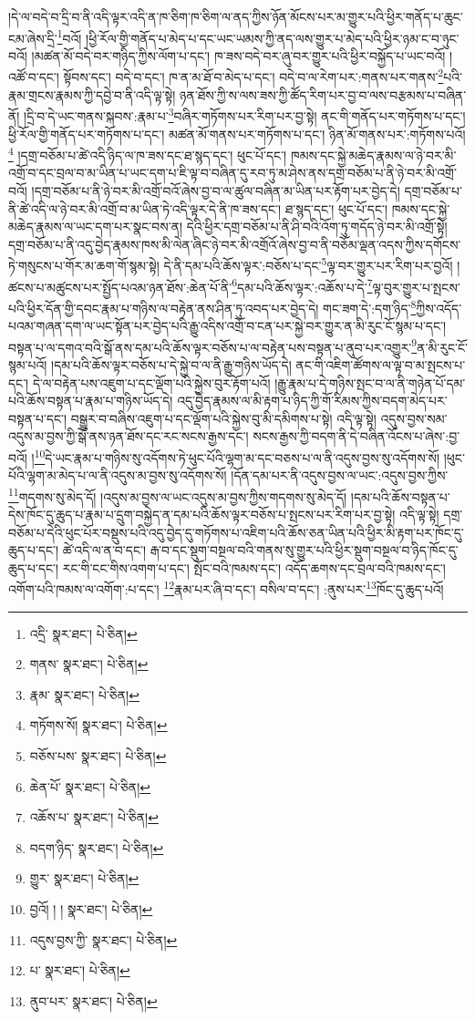 །དེ་ལ་བདེ་བ་དྲི་བ་ནི་འདི་ལྟར་འདི་ན་ཁ་ཅིག་ཁ་ཅིག་ལ་ནད་ཀྱིས་ཉོན་མོངས་པར་མ་གྱུར་པའི་ཕྱིར་གནོད་པ་ཆུང་ངམ་ཞེས་དྲི་\footnote{འདྲི་  སྣར་ཐང་།  པེ་ཅིན། }བའོ། །ཕྱི་རོལ་གྱི་གནོད་པ་མེད་པ་དང་ཡང་ཡམས་ཀྱི་ནད་ལས་གྱུར་པ་མེད་པའི་ཕྱིར་ཉམ་ང་བ་ཉུང་བའོ། །མཚན་མོ་བདེ་བར་གཉིད་ཀྱིས་ལོག་པ་དང་། ཁ་ཟས་བདེ་བར་ཞུ་བར་གྱུར་པའི་ཕྱིར་བསྐྱོད་པ་ཡང་བའོ། །འཚོ་བ་དང་། སྟོབས་དང་། བདེ་བ་དང་། ཁ་ན་མ་ཐོ་བ་མེད་པ་དང་། བདེ་བ་ལ་རེག་པར་:གནས་པར་གནས་\footnote{གནས་  སྣར་ཐང་།  པེ་ཅིན། }པའི་རྣམ་གྲངས་རྣམས་ཀྱི་དབྱེ་བ་ནི་འདི་ལྟ་སྟེ། ཉན་ཐོས་ཀྱི་ས་ལས་ཟས་ཀྱི་ཚོད་རིག་པར་བྱ་བ་ལས་བརྩམས་པ་བཞིན་ནོ། །དྲི་བ་དེ་ཡང་གནས་སྐབས་:རྣམ་པ་\footnote{རྣམ་  སྣར་ཐང་།  པེ་ཅིན། }བཞིར་གཏོགས་པར་རིག་པར་བྱ་སྟེ། ནང་གི་གནོད་པར་གཏོགས་པ་དང་། ཕྱི་རོལ་གྱི་གནོད་པར་གཏོགས་པ་དང་། མཚན་མོ་གནས་པར་གཏོགས་པ་དང་། ཉིན་མོ་གནས་པར་:གཏོགས་པའོ།\footnote{གཏོགས་སོ།  སྣར་ཐང་།  པེ་ཅིན། } །དགྲ་བཅོམ་པ་ཚེ་འདི་ཉིད་ལ་ཁ་ཟས་དང་ཐ་སྙད་དང་། ཕུང་པོ་དང་། ཁམས་དང་སྐྱེ་མཆེད་རྣམས་ལ་ཉེ་བར་མི་འགྲོ་བ་དང་བྲལ་བ་མ་ཡིན་པ་ཡང་དག་པ་ཇི་ལྟ་བ་བཞིན་དུ་རབ་ཏུ་མ་ཤེས་ནས་དགྲ་བཅོམ་པ་ནི་ཉེ་བར་མི་འགྲོ་བའོ། །དགྲ་བཅོམ་པ་ནི་ཉེ་བར་མི་འགྲོ་བའོ་ཞེས་བྱ་བ་ལ་ཚུལ་བཞིན་མ་ཡིན་པར་རྟོག་པར་བྱེད་དེ། དགྲ་བཅོམ་པ་ནི་ཚེ་འདི་ལ་ཉེ་བར་མི་འགྲོ་བ་མ་ཡིན་ཏེ་འདི་ལྟར་དེ་ནི་ཁ་ཟས་དང་། ཐ་སྙད་དང་། ཕུང་པོ་དང་། ཁམས་དང་སྐྱེ་མཆེད་རྣམས་ལ་ཡང་དག་པར་སྣང་བས་ན། དེའི་ཕྱིར་དགྲ་བཅོམ་པ་ནི་ཤི་བའི་འོག་ཏུ་གདོད་ཉེ་བར་མི་འགྲོ་སྟེ། དགྲ་བཅོམ་པ་ནི་འདུ་བྱེད་རྣམས་ཁས་མི་ལེན་ཞིང་ཉེ་བར་མི་འགྲོའོ་ཞེས་བྱ་བ་ནི་བཅོམ་ལྡན་འདས་ཀྱིས་དགོངས་ཏེ་གསུངས་པ་གོར་མ་ཆག་གོ་སྙམ་སྟེ། དེ་ནི་དམ་པའི་ཆོས་ལྟར་:བཅོས་པ་དང་\footnote{བཅོས་པས་  སྣར་ཐང་།  པེ་ཅིན། }ལྟ་བར་གྱུར་པར་རིག་པར་བྱའོ། །ཚངས་པ་མཚུངས་པར་སྤྱོད་པའམ་ཉན་ཐོས་:ཆེན་པོ་ནི་\footnote{ཆེན་པོ་  སྣར་ཐང་།  པེ་ཅིན། }དམ་པའི་ཆོས་ལྟར་:འཆོས་པ་དེ་\footnote{འཆོས་པ་  སྣར་ཐང་།  པེ་ཅིན། }ལྟ་བུར་གྱུར་པ་སྤངས་པའི་ཕྱིར་དོན་གྱི་དབང་རྣམ་པ་གཉིས་ལ་བརྟེན་ནས་ཤིན་ཏུ་འབད་པར་བྱེད་དེ། གང་ཟག་དེ་:དག་ཉིད་\footnote{བདག་ཉིད་  སྣར་ཐང་།  པེ་ཅིན། }ཀྱིས་འདོད་པའམ་གཞན་དག་ལ་ཡང་སྟོན་པར་བྱེད་པའི་རྒྱུ་འདིས་འགྲོ་བ་ངན་པར་སྐྱེ་བར་གྱུར་ན་མི་རུང་ངོ་སྙམ་པ་དང་། བསྟན་པ་ལ་དགའ་བའི་སྒོ་ནས་དམ་པའི་ཆོས་ལྟར་བཅོས་པ་ལ་བརྟེན་པས་བསྟན་པ་ནུབ་པར་འགྱུར་\footnote{གྱུར་  སྣར་ཐང་།  པེ་ཅིན། }ན་མི་རུང་ངོ་སྙམ་པའོ། །དམ་པའི་ཆོས་ལྟར་བཅོས་པ་དེ་སྐྱེ་བ་ལ་ནི་རྒྱུ་གཉིས་ཡོད་དེ། ནང་གི་འཇིག་ཚོགས་ལ་ལྟ་བ་མ་སྤངས་པ་དང་། དེ་ལ་བརྟེན་པས་འཇུག་པ་དང་ལྡོག་པའི་སྐྱེས་བུར་རྟོག་པའོ། །རྒྱུ་རྣམ་པ་དེ་གཉིས་སྤང་བ་ལ་ནི་གཉེན་པོ་དམ་པའི་ཆོས་བསྟན་པ་རྣམ་པ་གཉིས་ཡོད་དེ། འདུ་བྱེད་རྣམས་ལ་མི་རྟག་པ་ཉིད་ཀྱི་གོ་རིམས་ཀྱིས་བདག་མེད་པར་བསྟན་པ་དང་། བསྒྱུར་བ་བཞིས་འཇུག་པ་དང་ལྡོག་པའི་སྐྱེས་བུ་མི་དམིགས་པ་སྟེ། འདི་ལྟ་སྟེ། འདུས་བྱས་སམ་འདུས་མ་བྱས་ཀྱི་སྒོ་ནས་ཉན་ཐོས་དང་རང་སངས་རྒྱས་དང་། སངས་རྒྱས་ཀྱི་བདག་ནི་དེ་བཞིན་འོངས་པ་ཞེས་:བྱ་བའོ། །\footnote{བྱའོ། ། །  སྣར་ཐང་།  པེ་ཅིན། }དེ་ཡང་རྣམ་པ་གཉིས་སུ་འདོགས་ཏེ་ཕུང་པོའི་ལྷག་མ་དང་བཅས་པ་ལ་ནི་འདུས་བྱས་སུ་འདོགས་སོ། །ཕུང་པོའི་ལྷག་མ་མེད་པ་ལ་ནི་འདུས་མ་བྱས་སུ་འདོགས་སོ། །དོན་དམ་པར་ནི་འདུས་བྱས་ལ་ཡང་:འདུས་བྱས་ཀྱིས་\footnote{འདུས་བྱས་ཀྱི་  སྣར་ཐང་།  པེ་ཅིན། }གདགས་སུ་མེད་དོ། །འདུས་མ་བྱས་ལ་ཡང་འདུས་མ་བྱས་ཀྱིས་གདགས་སུ་མེད་དོ། །དམ་པའི་ཆོས་བསྟན་པ་དེས་ཁོང་དུ་ཆུད་པ་རྣམ་པ་དྲུག་བསྐྱེད་ན་དམ་པའི་ཆོས་ལྟར་བཅོས་པ་སྤངས་པར་རིག་པར་བྱ་སྟེ། འདི་ལྟ་སྟེ། དགྲ་བཅོམ་པ་དེའི་ཕུང་པོར་བསྡུས་པའི་འདུ་བྱེད་དུ་གཏོགས་པ་འཇིག་པའི་ཆོས་ཅན་ཡིན་པའི་ཕྱིར་མི་རྟག་པར་ཁོང་དུ་ཆུད་པ་དང་། ཚེ་འདི་ལ་ན་བ་དང་། རྒ་བ་དང་སྡུག་བསྔལ་བའི་གནས་སུ་གྱུར་པའི་ཕྱིར་སྡུག་བསྔལ་བ་ཉིད་ཁོང་དུ་ཆུད་པ་དང་། རང་གི་ངང་གིས་འགག་པ་དང་། སྤོང་བའི་ཁམས་དང་། འདོད་ཆགས་དང་བྲལ་བའི་ཁམས་དང་། འགོག་པའི་ཁམས་ལ་འགོག་:པ་དང་། \footnote{པ་  སྣར་ཐང་།  པེ་ཅིན། }རྣམ་པར་ཞི་བ་དང་། བསིལ་བ་དང་། :ནུས་པར་\footnote{ནུབ་པར་  སྣར་ཐང་།  པེ་ཅིན། }ཁོང་དུ་ཆུད་པའོ། 